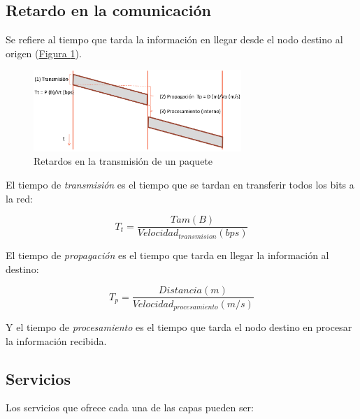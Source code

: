 \documentclass[10pt,a4paper,spanish]{report}
\begin{document}
\begin{center}
  
  \label{interfazSAP}
\end{center}

\subsection{\textcolor{tema1}Retardo en la comunicación}
Se refiere al tiempo que tarda la información en llegar desde el nodo destino al origen (\hyperref[retardos]{Figura \ref*{retardos}}).
\begin{figure}[!h]
  \centering
  \includegraphics[width=0.7\textwidth]{retardos}
  \caption{Retardos en la transmisión de un paquete}
  \label{retardos}
\end{figure}

El tiempo de \textit{\textcolor{tema1}{transmisión}} es el tiempo que se tardan en transferir todos los bits a la red:

\begin{displaymath}
  T_t = \frac{Tam (B)}{Velocidad_{transmision} (bps)}
\end{displaymath}

El tiempo de \textit{\textcolor{tema1}{propagación}} es el tiempo que tarda en llegar la información al destino:

\begin{displaymath}
  T_p = \frac{Distancia (m)}{Velocidad_{procesamiento} (m/s)}
\end{displaymath}

Y el tiempo de \textit{\textcolor{tema1}{procesamiento}} es el tiempo que tarda el nodo destino en procesar la información recibida.


\subsection{\textcolor{tema1}Servicios}
Los servicios que ofrece cada una de las capas pueden ser:
\end{document}
